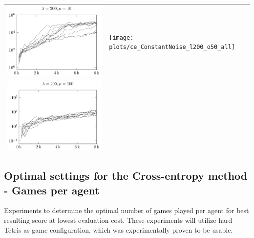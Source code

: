 \begin{tabular}{@{}l@{}l@{}}
\includegraphics[scale=1]{plots/ce_ConstantNoise_l200_o20_all} &
\texttt{[image: plots/ce\_ConstantNoise\_l200\_o50\_all]} \\
\includegraphics[scale=1]{plots/ce_ConstantNoise_l200_o100_all}
\end{tabular}


\clearpage

\subsection{Optimal settings for the Cross-entropy method - Games per agent \label{appendixCEPopulationParent}}
Experiments to determine the optimal number of games played per agent for best resulting
score at lowest evaluation cost. These experiments will utilize hard Tetris as game configuration, 
which was experimentally proven to be usable.

